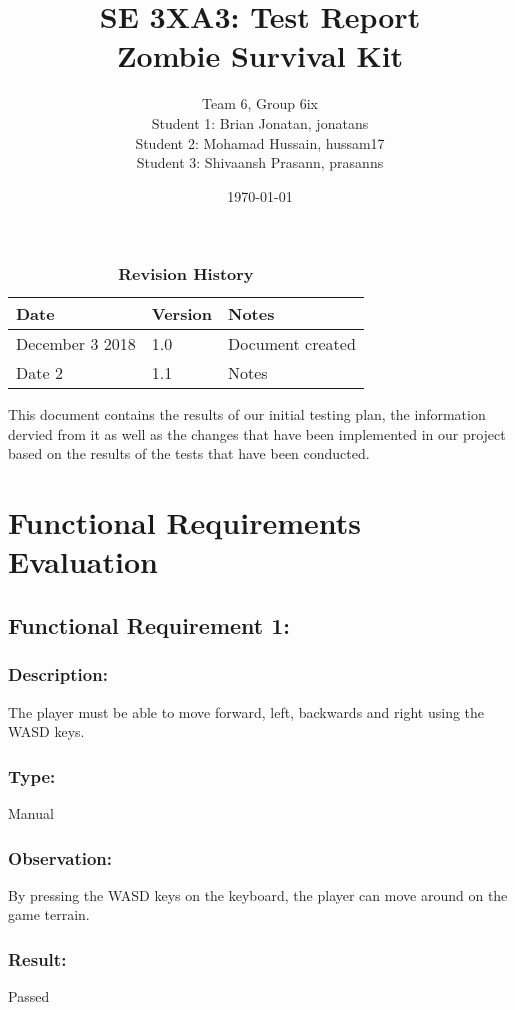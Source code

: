 \documentclass[12pt, titlepage]{article}
\title{SE 3XA3: Test Report\\Zombie Survival Kit}
\author{Team 6, Group 6ix
		\\ Student 1: Brian Jonatan,  jonatans
		\\ Student 2: Mohamad Hussain, hussam17
		\\ Student 3: Shivaansh Prasann, prasanns
}
\date{\today}
\begin{document}
\maketitle

\tableofcontents
\listoftables
\listoffigures

\begin{table}[bp]
\caption{\bf Revision History}
\begin{tabularx}{\textwidth}{p{3cm}p{2cm}X}
\toprule {\bf Date} & {\bf Version} & {\bf Notes}\\
\midrule
 December 3 2018 & 1.0 & Document created\\
Date 2 & 1.1 & Notes\\
\bottomrule
\end{tabularx}
\end{table}

\newpage


This document contains the results of our initial testing plan, the information dervied from it as well as the changes that have been implemented in our project based on the results of the tests that have been conducted.

\section{Functional Requirements Evaluation}
\subsection{Functional Requirement 1: } 

\subsubsection{Description: }The player must be able to move forward, left, backwards and right using the WASD keys.

\subsubsection{Type: } Manual

\subsubsection{Observation: } By pressing the WASD keys on the keyboard, the player can move around on the game terrain. 

\subsubsection[Pass / Fail:] {Result: } Passed
\end{document}
